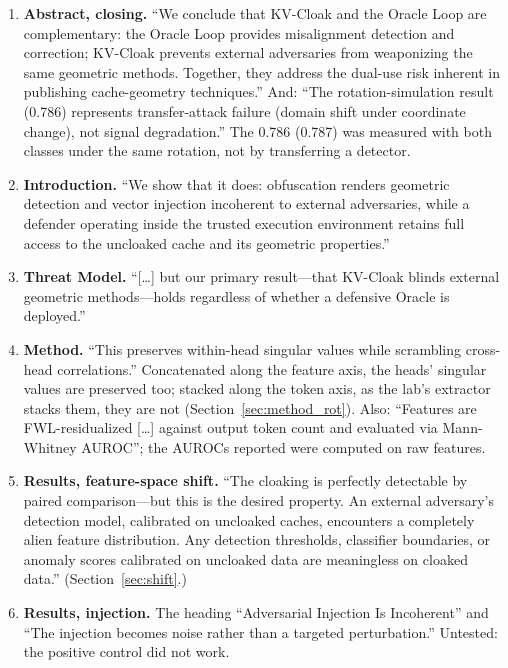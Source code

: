 \documentclass[11pt,a4paper]{article}
\begin{document}
\begin{enumerate}
\item \textbf{Abstract, closing.} ``We conclude that KV-Cloak and the
Oracle Loop are complementary: the Oracle Loop provides misalignment
detection and correction; KV-Cloak prevents external adversaries from
weaponizing the same geometric methods. Together, they address the
dual-use risk inherent in publishing cache-geometry techniques.'' And:
``The rotation-simulation result (0.786) represents transfer-attack
failure (domain shift under coordinate change), not signal
degradation.'' The 0.786 (0.787) was measured with both classes under the
same rotation, not by transferring a detector.

\item \textbf{Introduction.} ``We show that it does: obfuscation renders
geometric detection and vector injection incoherent to external
adversaries, while a defender operating inside the trusted execution
environment retains full access to the uncloaked cache and its geometric
properties.''

\item \textbf{Threat Model.} ``[\ldots] but our primary result---that
KV-Cloak blinds external geometric methods---holds regardless of whether
a defensive Oracle is deployed.''

\item \textbf{Method.} ``This preserves within-head singular values while
scrambling cross-head correlations.'' Concatenated along the feature
axis, the heads' singular values are preserved too; stacked along the
token axis, as the lab's extractor stacks them, they are not
(Section~\ref{sec:method_rot}). Also: ``Features are FWL-residualized [\ldots] against output token
count and evaluated via Mann-Whitney AUROC''; the AUROCs reported were computed on raw features.

\item \textbf{Results, feature-space shift.} ``The cloaking is perfectly
detectable by paired comparison---but this is the desired property. An
external adversary's detection model, calibrated on uncloaked caches,
encounters a completely alien feature distribution. Any detection
thresholds, classifier boundaries, or anomaly scores calibrated on
uncloaked data are meaningless on cloaked data.'' (Section~\ref{sec:shift}.)

\item \textbf{Results, injection.} The heading ``Adversarial Injection Is
Incoherent'' and ``The injection becomes noise rather than a targeted
perturbation.'' Untested: the positive control did not work.


\end{enumerate}
\end{document}
